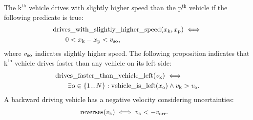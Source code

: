The $\text{k}^\mathrm{th}$ vehicle drives with slightly higher speed than the $\text{p}^\mathrm{th}$ vehicle if the following predicate is true:
\begin{align*}
\begin{split}
& \operatorname*{drives\_with\_slightly\_higher\_speed}(x_\text{k}, x_\text{p}) \iff  \\
& \qquad 0 < x_\text{k} - x_\text{p} < v_\text{so}, 
\end{split}
\end{align*} 
where $v_\text{so}$ indicates slightly higher speed. The following proposition indicates that $\text{k}^\mathrm{th}$ vehicle drives faster than any vehicle on its left side:
\begin{align*}
\begin{split}
& \operatorname*{drives\_faster\_than\_vehicle\_left}(v_\mathrm{k}) \iff  \\
& \qquad \exists \text{o} \in \{1...N\}: \operatorname*{vehicle\_is\_left}(x_\text{o}) \land v_\mathrm{k} > v_\text{o}.
\end{split}
\end{align*} 
A backward driving vehicle has a negative velocity considering uncertainties:
\begin{align*}
\begin{split}
& \operatorname*{reverses}(v_\mathrm{k}) \iff v_\mathrm{k} < -v_\text{err}.
\end{split}
\end{align*}

